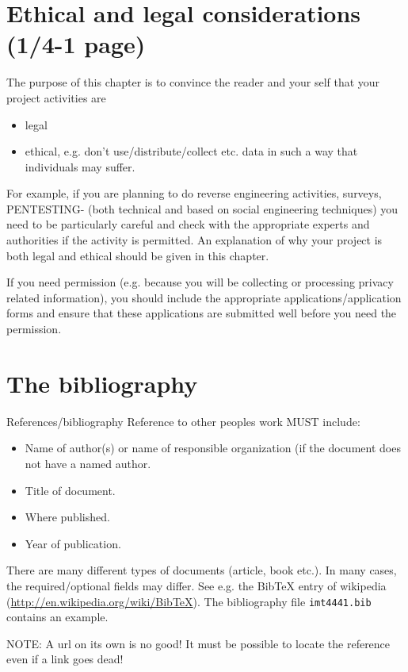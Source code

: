 \documentclass[gjovik]{gucmasterproject}
\begin{document}
\chapter{Ethical and legal considerations (1/4-1 page)}
The purpose of this chapter is to convince the
reader and your self that your project activities are
\begin{itemize}
\item legal
\item ethical, e.g. don't use/distribute/collect etc. data in such a way that individuals may suffer.
\end{itemize}
For example, if you are planning to do reverse engineering activities, surveys, PENTESTING- (both technical and based on social engineering techniques) you need to be particularly careful and check with the appropriate experts and authorities if the activity is permitted.  An explanation of why your project is both legal and ethical should be given in this chapter.

If you need permission (e.g. because you will be collecting or processing privacy related information), 
you should  include the appropriate applications/application forms and ensure that these applications 
are submitted well before you need the permission.


\chapter{The bibliography}
References/bibliography
Reference to other peoples work MUST include:
\begin{itemize}
\item Name of author(s)  or name of responsible organization (if the document does not have a named author.
\item Title of document.
\item Where published.
\item Year of publication.
\end{itemize}

There are many different types of documents (article, book etc.).
In many cases, the required/optional fields may differ.
See e.g. the BibTeX entry of wikipedia (\url{http://en.wikipedia.org/wiki/BibTeX}).
The bibliography file 
\verb+imt4441.bib+ 
contains an example.

NOTE: A url on its own is no good!
It must be possible to locate the reference even if a link goes dead!
\end{document}
